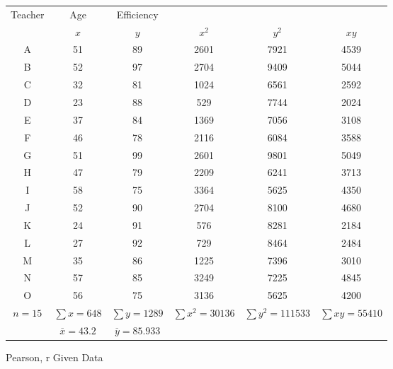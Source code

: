 \documentclass{article}
\begin{document}
    \begin{figure}
        \begin{adjustwidth}{-1cm}{}
            \begin{tabular}{cccccc}
                Teacher&Age&Efficiency\\
                &$x$&$y$&$x^2$&$y^2$&$xy$\\
                A & 51 & 89 & 2601 & 7921 & 4539 \\
                B & 52 & 97 & 2704 & 9409 & 5044 \\
                C & 32 & 81 & 1024 & 6561 & 2592 \\
                D & 23 & 88 & 529 & 7744 & 2024 \\
                E & 37 & 84 & 1369 & 7056 & 3108 \\
                F & 46 & 78 & 2116 & 6084 & 3588 \\
                G & 51 & 99 & 2601 & 9801 & 5049 \\
                H & 47 & 79 & 2209 & 6241 & 3713 \\
                I & 58 & 75 & 3364 & 5625 & 4350 \\
                J & 52 & 90 & 2704 & 8100 & 4680 \\
                K & 24 & 91 & 576 & 8281 & 2184 \\
                L & 27 & 92 & 729 & 8464 & 2484 \\
                M & 35 & 86 & 1225 & 7396 & 3010 \\
                N & 57 & 85 & 3249 & 7225 & 4845 \\
                O & 56 & 75 & 3136 & 5625 & 4200 \\
                $n=15$&$\sum x=648$&$\sum y=1289$&$\sum x^2=30136$&$\sum y^2=111533$&$\sum xy=55410$\\
                &$\overline{x}=43.2$&$\overline{y}=85.933$
            \end{tabular}
            \caption{\label{fig:text}Pearson, r Given Data}
        \end{adjustwidth}
    \end{figure}
    
\end{document}
